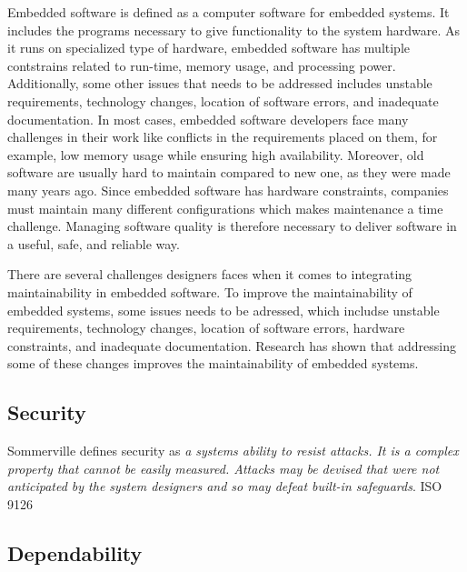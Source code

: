 Embedded software is defined as a computer software for embedded systems\cite{radatz1990ieee}. It includes the programs necessary to give functionality to the system hardware. As it runs on specialized type of hardware, embedded software has multiple contstrains related to run-time, memory usage, and processing power. Additionally, some other issues that needs to be addressed includes unstable requirements, technology changes, location of software errors, and inadequate documentation\cite{jimenez2013introduction}. In most cases, embedded software developers face many challenges in their work like conflicts in the requirements placed on them, for example, low memory usage while ensuring high availability\cite{vulgarakis2008embedded}. Moreover, old software are usually hard to maintain compared to new one, as they were made many years ago. Since embedded software has hardware constraints, companies must maintain many different configurations which makes maintenance a time challenge. Managing software quality is therefore necessary to deliver software in a useful, safe, and reliable way\cite{563572}. 






There are several challenges designers faces when it comes to integrating maintainability in embedded software. To improve the maintainability of embedded systems, some issues needs to be adressed, which includse unstable requirements, technology changes, location of software errors, hardware constraints, and inadequate documentation. Research has shown that addressing some of these changes improves the maintainability of embedded systems.


\subsection{Security}
Sommerville defines security as \textit{a systems ability to resist attacks. It is a complex property that cannot be easily measured. Attacks may be devised that were not anticipated by the system designers and so may defeat built-in safeguards}\cite{Sommerville:2011:SE}.
ISO 9126


\subsection{Dependability}



